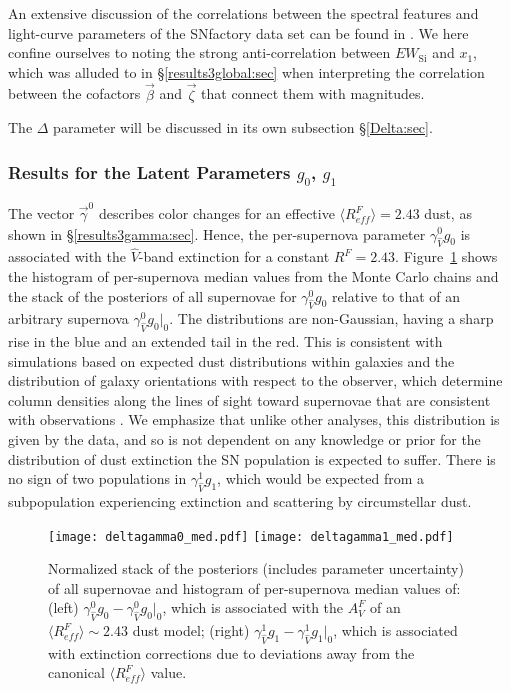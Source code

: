 \documentclass[trackchanges]{aastex62}   	%
\begin{document}
An extensive discussion of the correlations between the spectral features  and light-curve parameters of the SNfactory data
set can be found in \citet{chotard:thesis, leget:thesis, 2017Chotard}. 
We here confine ourselves to noting the strong anti-correlation between $EW_{\mathrm{Si}}$ and $x_1$, which was alluded
to in \S\ref{results3global:sec} when interpreting the correlation between the cofactors $\vec{\beta}$ and $\vec{\zeta}$ that connect them with magnitudes.

The $\Delta$ parameter will be discussed in its own subsection \S\ref{Delta:sec}.

\subsubsection{Results for the Latent  Parameters $g_0$, $g_1$}
\label{g0g1:sec}
The vector
$\vec{\gamma}^0$ describes color changes for an effective $\langle R^F_{\mathit{eff}}\rangle=2.43$ dust, as shown 
in  \S\ref{results3gamma:sec}.
Hence, the per-supernova parameter $\gamma^0_{\hat{V}} g_0$ is associated with the $\hat{V}$-band
extinction for a constant $R^F=2.43$.
Figure~\ref{k0_med:fig} shows the histogram of
per-supernova
median values
from the Monte Carlo chains
and the  stack of the posteriors of all supernovae  for $\gamma^0_{\hat{V}} g_0$ 
relative to that of an arbitrary supernova  $\gamma^0_{\hat{V}} g_0|_0$.
The distributions are non-Gaussian, having a sharp rise in the blue and an extended tail in the red.  This is consistent
with
simulations based on expected dust distributions
within galaxies and the distribution of galaxy orientations with respect to the observer,
which determine column densities along the lines of sight toward supernovae that are consistent with observations
\citep{1998ApJ...502..177H, 2007ApJ...659..122J}.  
We emphasize that unlike other analyses,
this distribution is given by the data, and so is not dependent on any knowledge or prior
for the distribution of dust extinction the SN population is expected to suffer. 
There is no sign of two populations in $\gamma^1_{\hat{V}} g_1$, which would be expected from a subpopulation
experiencing extinction and scattering by circumstellar dust.

\begin{figure}[htbp] %
   \centering
   \texttt{[image: deltagamma0\_med.pdf]}
   \texttt{[image: deltagamma1\_med.pdf]}
      \caption{
      Normalized stack of the posteriors (includes parameter uncertainty) of all supernovae  and histogram 
      of  per-supernova 
median values of: (left) $\gamma^0_{\hat{V}} g_0-\gamma^0_{\hat{V}} g_0|_0$, which is associated with the $A^F_V$ of an $\langle R^F_{\mathit{eff}}\rangle \sim 2.43$ dust model;
(right) $\gamma^1_{\hat{V}} g_1-\gamma^1_{\hat{V}} g_1|_0$,
which  is associated with extinction corrections due to deviations away from the canonical $\langle R^F_{\mathit{eff}}\rangle$ value.
   \label{k0_med:fig}}
\end{figure}
\end{document}
